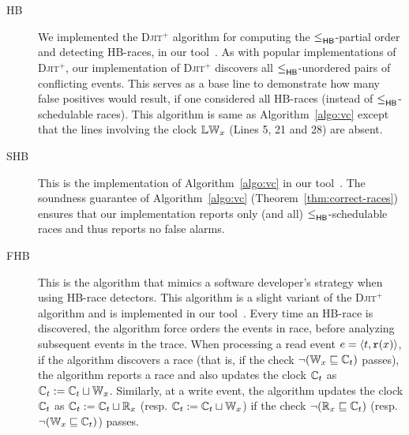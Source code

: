 \begin{description}
\item[HB] We implemented the 
  \textsc{Djit}$^+$ algorithm for computing the $\leq^{}_{\mathsf{HB}}$-partial order
  and detecting HB-races, in our tool~\tool.  As with popular
  implementations of \textsc{Djit}$^+$, our implementation
  of \textsc{Djit}$^+$ discovers all $\leq^{}_{\mathsf{HB}}$-unordered pairs of
  conflicting events. This serves as a base line to demonstrate how
  many false positives would result, if one considered all HB-races
  (instead of $\leq^{}_{\mathsf{HB}}$-schedulable races).  This algorithm is same as
  Algorithm~\ref{algo:vc} except that the lines involving the clock
  $\mathbb{LW}_x$ (Lines 5, 21 and 28) are absent.
\item[SHB] This is the implementation of Algorithm~\ref{algo:vc}
  in our tool~\tool. The soundness guarantee of Algorithm~\ref{algo:vc}
  (Theorem~\ref{thm:correct-races}) ensures that our implementation
  reports only (and all) $\leq^{}_{\mathsf{HB}}$-schedulable races and thus reports no false alarms.
\item[FHB] This is the algorithm that mimics a software developer's strategy 
  when using HB-race detectors. 
  This algorithm is a slight variant of the \textsc{Djit}$^+$
  algorithm and is implemented in our tool~\tool.
  Every time an HB-race is discovered,
  the algorithm force orders the events in race, before analyzing subsequent
  events in the trace.
  When processing a read event $e = \langle t, \mathtt{r}(x)\rangle$, if the
  algorithm discovers a race (that is, if the check $\neg(\mathbb{W}_x \sqsubseteq \mathbb{C}_t)$ passes),
  the algorithm reports a race and also updates the clock
  $\mathbb{C}_t$ as $\mathbb{C}_t := \mathbb{C}_t \sqcup \mathbb{W}_x$.
  Similarly, at a write event, the algorithm updates the clock
  $\mathbb{C}_t$ as $\mathbb{C}_t := \mathbb{C}_t \sqcup \mathbb{R}_x$ (resp. $\mathbb{C}_t := \mathbb{C}_t \sqcup \mathbb{W}_x$)
  if the check $\neg(\mathbb{R}_x \sqsubseteq \mathbb{C}_t)$ (resp. $\neg(\mathbb{W}_x \sqsubseteq \mathbb{C}_t)$) passes.

\end{description}
